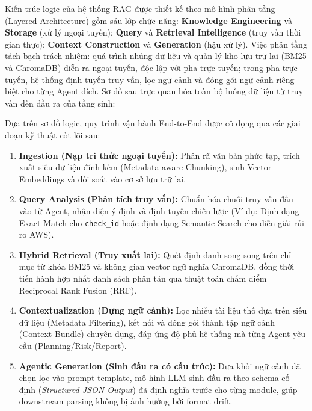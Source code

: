 Kiến trúc logic của hệ thống RAG được thiết kế theo mô hình phân tầng (Layered Architecture) gồm sáu lớp chức năng: \textbf{Knowledge Engineering} và \textbf{Storage} (xử lý ngoại tuyến); \textbf{Query} và \textbf{Retrieval Intelligence} (truy vấn thời gian thực); \textbf{Context Construction} và \textbf{Generation} (hậu xử lý). Việc phân tầng tách bạch trách nhiệm: quá trình nhúng dữ liệu và quản lý kho lưu trữ lai (BM25 và ChromaDB) diễn ra ngoại tuyến, độc lập với pha trực tuyến; trong pha trực tuyến, hệ thống định tuyến truy vấn, lọc ngữ cảnh và đóng gói ngữ cảnh riêng biệt cho từng Agent đích. Sơ đồ sau trực quan hóa toàn bộ luồng dữ liệu từ truy vấn đến đầu ra của tầng sinh:



Dựa trên sơ đồ logic, quy trình vận hành End-to-End được cô đọng qua các giai đoạn kỹ thuật cốt lõi sau:

\begin{enumerate}
    \item \textbf{Ingestion (Nạp tri thức ngoại tuyến):} Phân rã văn bản phức tạp, trích xuất siêu dữ liệu đính kèm (Metadata-aware Chunking), sinh Vector Embeddings và đối soát vào cơ sở lưu trữ lai.
    \item \textbf{Query Analysis (Phân tích truy vấn):} Chuẩn hóa chuỗi truy vấn đầu vào từ Agent, nhận diện ý định và định tuyến chiến lược (Ví dụ: Định dạng Exact Match cho \texttt{check\_id} hoặc định dạng Semantic Search cho diễn giải rủi ro AWS).
    \item \textbf{Hybrid Retrieval (Truy xuất lai):} Quét định danh song song trên chỉ mục từ khóa BM25 và không gian vector ngữ nghĩa ChromaDB, đồng thời tiến hành hợp nhất danh sách phân tán qua thuật toán chấm điểm Reciprocal Rank Fusion (RRF).
    \item \textbf{Contextualization (Dựng ngữ cảnh):} Lọc nhiễu tài liệu thô dựa trên siêu dữ liệu (Metadata Filtering), kết nối và đóng gói thành tập ngữ cảnh (Context Bundle) chuyên dụng, đáp ứng độ phủ hệ thống mà từng Agent yêu cầu (Planning/Risk/Report).
    \item \textbf{Agentic Generation (Sinh đầu ra có cấu trúc):} Đưa khối ngữ cảnh đã chọn lọc vào prompt template, mô hình LLM sinh đầu ra theo schema cố định (\textit{Structured JSON Output}) đã định nghĩa trước cho từng module, giúp downstream parsing không bị ảnh hưởng bởi format drift.
\end{enumerate}



